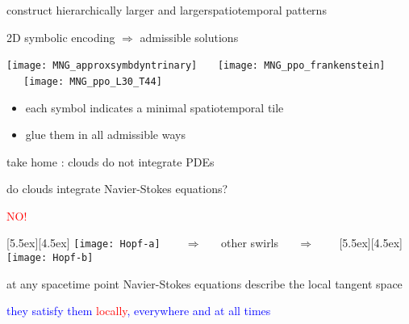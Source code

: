 \begin{frame}{construct hierarchically larger and largerspatiotemporal patterns }
  \begin{block} {2D symbolic encoding $\Rightarrow$ admissible solutions}
  \begin{center}
\texttt{[image: MNG\_approxsymbdyntrinary]}
~~~\texttt{[image: MNG\_ppo\_frankenstein]}
~~~\texttt{[image: MNG\_ppo\_L30\_T44]}
  \end{center}
  \end{block}
\begin{itemize}
 \item each symbol indicates a minimal spatiotemporal tile
 \item glue them in all admissible ways
\end{itemize}
\end{frame}


\begin{frame}{take home : clouds do not integrate PDEs}

do clouds integrate Navier-Stokes equations?

\begin{center}
\centerline{\textcolor{red}{\Huge NO!}}

\begin{minipage}[t]{\textwidth}
	\begin{center}
\centerline{
\raisebox{-4.0ex}[5.5ex][4.5ex]
		 {\texttt{[image: Hopf-a]}}
~~~ $\Longrightarrow$ ~~ {other swirls} ~~ $\Longrightarrow$ ~~~
	\raisebox{-4.0ex}[5.5ex][4.5ex]
		 {\texttt{[image: Hopf-b]}}
          }
	\end{center}
\end{minipage}
\end{center}

at any spacetime point Navier-Stokes equations describe the local tangent space

\bigskip

\centerline{
\textcolor{blue}{they satisfy them \textcolor{red}{\large locally}, everywhere and at all times}
}
\end{frame}


